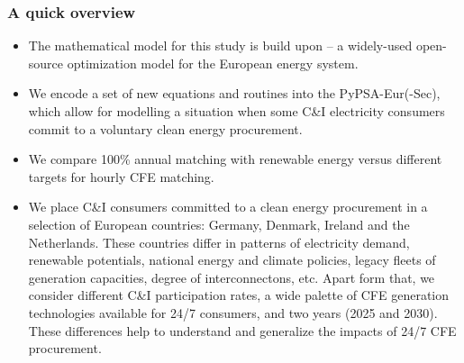 \begin{frame}
  \frametitle{A quick overview}


{\small
  \begin{itemize}
    
    \item The mathematical model for this study is build upon 
     --
    a widely-used open-source optimization model for the European energy system.

    \item We encode a set of new equations and routines into the PyPSA-Eur(-Sec),
    which allow for modelling a situation when some C\&I electricity consumers 
    commit to a voluntary clean energy procurement.

    \item We compare 100\% annual matching with renewable energy versus 
    different targets for hourly CFE matching.

    \item We place C\&I consumers committed to a clean energy procurement in a 
    selection of European countries: Germany, Denmark, Ireland and the Netherlands.
    These countries differ in patterns of electricity demand, renewable potentials,
    national energy and climate policies, legacy fleets of generation capacities, degree 
    of interconnectons, etc. Apart form that, we consider different C\&I participation rates, a wide palette 
    of CFE generation technologies available for 24/7 consumers, 
    and two years (2025 and 2030). These differences help to understand and generalize 
    the impacts of 24/7 CFE procurement.
    
  \end{itemize}
}

\end{frame}


